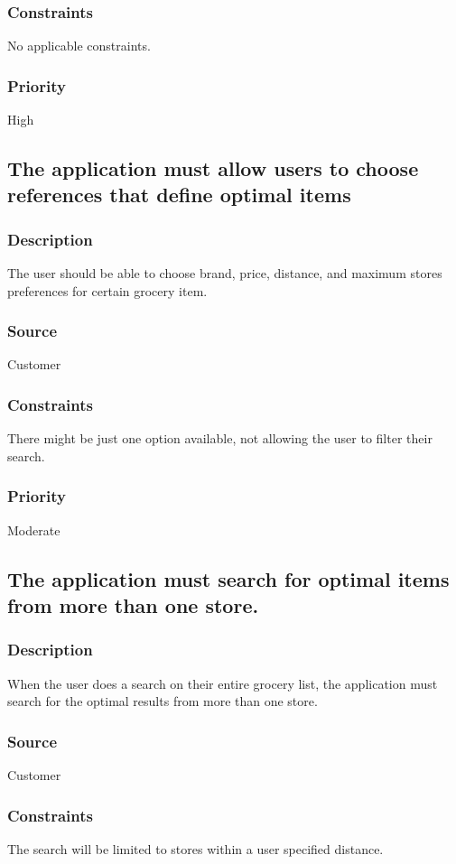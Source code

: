 \subsubsection{Constraints}
No applicable constraints.
\subsubsection{Priority}
High\\

\subsection{The application must allow users to choose references that define optimal items}
\subsubsection{Description}
The user should be able to choose brand, price, distance, and maximum stores preferences for certain grocery item.
\subsubsection{Source}
Customer
\subsubsection{Constraints}
There might be just one option available, not allowing the user to filter their search.
\subsubsection{Priority}
Moderate\\

\subsection{The application must search for optimal items from more than one store.}
\subsubsection{Description}
When the user does a search on their entire grocery list, the application must search for the optimal results from more than one store.
\subsubsection{Source}
Customer
\subsubsection{Constraints}
The search will be limited to stores within a user specified distance.
